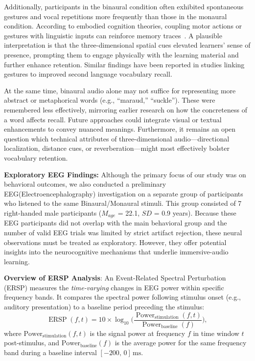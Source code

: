 \documentclass{ehissymp}
\begin{document}
Additionally, participants in the binaural condition often exhibited spontaneous gestures and vocal repetitions more frequently than those in the monaural condition. According to embodied cognition theories, coupling motor actions or gestures with linguistic inputs can reinforce memory traces~\cite{Macedonia2011,Macedonia2011b}. A plausible interpretation is that the three-dimensional spatial cues elevated learners’ sense of presence, prompting them to engage physically with the learning material and further enhance retention. Similar findings have been reported in studies linking gestures to improved second language vocabulary recall\cite{Tellier2008}.

At the same time, binaural audio alone may not suffice for representing more abstract or metaphorical words (e.g., “maraud,” “suckle”). These were remembered less effectively, mirroring earlier research on how the concreteness of a word affects recall\cite{Clark1991}. Future approaches could integrate visual or textual enhancements to convey nuanced meanings. Furthermore, it remains an open question which technical attributes of three-dimensional audio—directional localization, distance cues, or reverberation—might most effectively bolster vocabulary retention.

\textbf{Exploratory EEG Findings:} Although the primary focus of our study was on behavioral outcomes, we also conducted a preliminary EEG(Electroencephalography) investigation on a separate group of participants who listened to the same Binaural/Monaural stimuli. This group consisted of 7 right-handed male participants ($M_{age}$ = 22.1, $SD$ = 0.9 years). Because these EEG participants did not overlap with the main behavioral group and the number of valid EEG trials was limited by strict artifact rejection, these neural observations must be treated as exploratory. However, they offer potential insights into the neurocognitive mechanisms that underlie immersive-audio learning.

\textbf{Overview of ERSP Analysis}:
An Event-Related Spectral Perturbation (ERSP) measures the \emph{time-varying} changes in EEG power within specific frequency bands.
It compares the spectral power following stimulus onset (e.g., auditory presentation) to a baseline period preceding the stimulus:
\[
  \operatorname{ERSP}(f,t)
  = 10 \times \log_{10}\!\biggl(\frac{\operatorname{Power}_{\operatorname{stimulation}}(f,t)}{\operatorname{Power}_{\operatorname{baseline}}(f)}\biggr),
\]
where $\mathrm{Power}_{\mathrm{stimulation}}(f,t)$ is the signal power at frequency $f$ in time window $t$ post-stimulus, and $\mathrm{Power}_{\mathrm{baseline}}(f)$ is the average power for the same frequency band during a baseline interval \([-200,\,0]\,\mathrm{ms}\).
\end{document}
